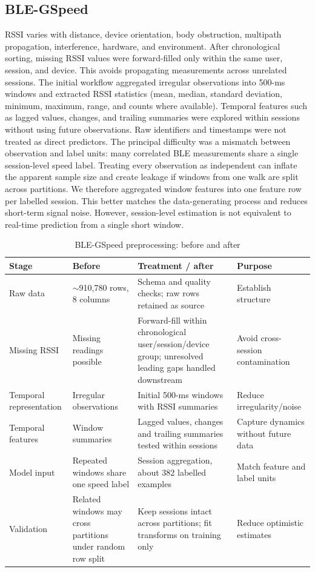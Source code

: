 \documentclass[conference]{IEEEtran}
\begin{document}
\subsection{BLE-GSpeed}
RSSI varies with distance, device orientation, body obstruction, multipath propagation, interference, hardware, and environment. After chronological sorting, missing RSSI values were forward-filled only within the same user, session, and device. This avoids propagating measurements across unrelated sessions. The initial workflow aggregated irregular observations into 500-ms windows and extracted RSSI statistics (mean, median, standard deviation, minimum, maximum, range, and counts where available). Temporal features such as lagged values, changes, and trailing summaries were explored within sessions without using future observations. Raw identifiers and timestamps were not treated as direct predictors.
The principal difficulty was a mismatch between observation and label units: many correlated BLE measurements share a single session-level speed label. Treating every observation as independent can inflate the apparent sample size and create leakage if windows from one walk are split across partitions. We therefore aggregated window features into one feature row per labelled session. This better matches the data-generating process and reduces short-term signal noise. However, session-level estimation is not equivalent to real-time prediction from a single short window.
\begin{table}[t]
\caption{BLE-GSpeed preprocessing: before and after}
\centering\small
\begin{tabular}{p{}p{}p{}p{}}
\toprule Stage & Before & Treatment / after & Purpose\\\midrule
Raw data & $\sim$910,780 rows, 8 columns & Schema and quality checks; raw rows retained as source & Establish structure\\
Missing RSSI & Missing readings possible & Forward-fill within chronological user/session/device group; unresolved leading gaps handled downstream & Avoid cross-session contamination\\
Temporal representation & Irregular observations & Initial 500-ms windows with RSSI summaries & Reduce irregularity/noise\\
Temporal features & Window summaries & Lagged values, changes and trailing summaries tested within sessions & Capture dynamics without future data\\
Model input & Repeated windows share one speed label & Session aggregation, about 382 labelled examples & Match feature and label units\\
Validation & Related windows may cross partitions under random row split & Keep sessions intact across partitions; fit transforms on training only & Reduce optimistic estimates\\
\bottomrule
\end{tabular}
\end{table}
\end{document}
